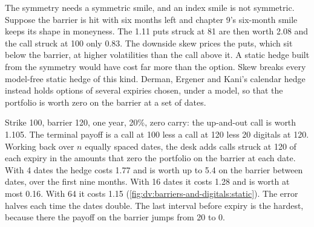 The symmetry needs a symmetric smile, and an index smile is not symmetric. Suppose the barrier is hit with six months
left and chapter 9's six-month smile keeps its shape in moneyness. The 1.11 puts struck at 81 are then worth 2.08 and
the call struck at 100 only 0.83. The downside skew prices the puts, which sit below the barrier, at higher
volatilities than the call above it. A static hedge built from the symmetry would have cost far more than the option.
Skew breaks every model-free static hedge of this kind. Derman, Ergener and Kani's calendar hedge instead holds
options of several expiries chosen, under a model, so that the portfolio is worth zero on the barrier at a set of
dates.

\begin{example}\label{ex:dv:barriers-and-digitals:calendar}
Strike 100, barrier 120, one year, 20\%, zero carry: the up-and-out call is worth 1.105. The terminal payoff is a call
at 100 less a call at 120 less 20 digitals at 120. Working back over $n$ equally spaced dates, the desk adds calls
struck at 120 of each expiry in the amounts that zero the portfolio on the barrier at each date. With 4 dates the hedge
costs 1.77 and is worth up to 5.4 on the barrier between dates, over the first nine months. With 16 dates it costs 1.28
and is worth at most 0.16. With 64 it costs 1.15 (\cref{fig:dv:barriers-and-digitals:static}). The error halves each time
the dates double. The last interval before expiry is the hardest, because there the payoff on the barrier jumps from
20 to 0.
\end{example}

